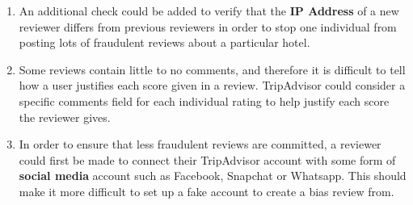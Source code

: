 \documentclass{article}
\begin{document}
	\begin{enumerate}
		\item An additional check could be added to verify that the \textbf{IP Address} of a new reviewer differs from previous reviewers in order to stop one individual from posting lots of fraudulent reviews about a particular hotel.
		\item Some reviews contain little to no comments, and therefore it is difficult to tell how a user justifies each score given in a review. TripAdvisor could consider a specific comments field for each individual rating to help justify each score the reviewer gives.
		\item In order to ensure that less fraudulent reviews are committed, a reviewer could first be made to connect their TripAdvisor account with some form of \textbf{social media} account such as Facebook, Snapchat or Whatsapp. This should make it more difficult to set up a fake account to create a bias review from.
	\end{enumerate}
	
\end{document}
